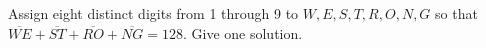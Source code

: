 Assign eight distinct digits from 1 through 9 to $W,E,S,T,R,O,N,G$ so that $\overline{WE}+\overline{ST}+\overline{RO}+\overline{NG}=128$. Give one solution.
